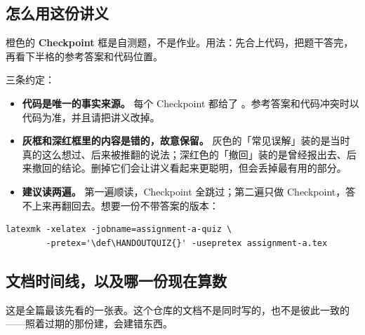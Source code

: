 \subsection{怎么用这份讲义}
\label{sec:a-howto}

橙色的 \textbf{Checkpoint} 框是自测题，不是作业。用法：先合上代码，把题干答完，再看下半格的参考答案和代码位置。

三条约定：

\begin{itemize}[itemsep=2pt]
  \item \textbf{代码是唯一的事实来源。} 每个 Checkpoint 都给了 。参考答案和代码冲突时以代码为准，并且请把讲义改掉。
  \item \textbf{灰框和深红框里的内容是错的，故意保留。} 灰色的「常见误解」装的是当时真的这么想过、后来被推翻的说法；深红色的「撤回」装的是曾经报出去、后来撤回的结论。删掉它们会让讲义看起来更聪明，但会丢掉最有用的部分。
  \item \textbf{建议读两遍。} 第一遍顺读，Checkpoint 全跳过；第二遍只做 Checkpoint，答不上来再翻回去。想要一份不带答案的版本：
\end{itemize}

\begin{lstlisting}[style=hlshell]
latexmk -xelatex -jobname=assignment-a-quiz \
        -pretex='\def\HANDOUTQUIZ{}' -usepretex assignment-a.tex
\end{lstlisting}

\subsection{文档时间线，以及哪一份现在算数}
\label{sec:a-timeline}

这是全篇最该先看的一张表。这个仓库的文档不是同时写的，也不是彼此一致的——照着过期的那份建，会建错东西。

